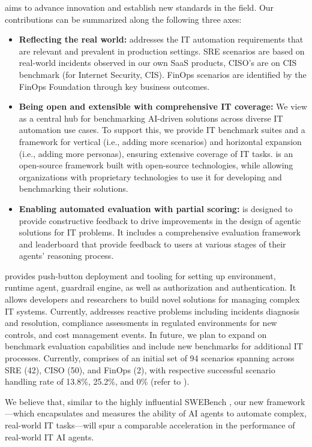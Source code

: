\bench aims to advance innovation and establish new standards in the field. Our contributions can be summarized along the following three axes:

\begin{itemize}[left=0pt, topsep=0pt, partopsep=0pt, itemsep=0pt, parsep=0pt]
\item \textbf{Reflecting the real world:} \bench  addresses the IT automation requirements that are relevant and prevalent in production settings. SRE scenarios are based on real-world incidents observed in our own SaaS products, CISO’s are on CIS benchmark (for Internet Security, CIS). FinOps scenarios are identified by the FinOps Foundation \cite{finopsbench} through key business outcomes.

\item \textbf{Being open and extensible with comprehensive IT coverage:} 
We view \bench as a central hub for benchmarking AI-driven solutions across diverse IT automation use cases. To support this, we provide IT benchmark suites and a framework for vertical (i.e., adding more scenarios) and horizontal expansion (i.e., adding more personas), ensuring extensive coverage of IT tasks. 
\bench is an open-source framework built with open-source technologies, while allowing organizations with proprietary technologies to use it for developing and benchmarking their solutions.  


\item \textbf{Enabling automated evaluation with partial scoring:} 
\bench is designed to provide constructive feedback to drive improvements in the design of agentic solutions for IT problems. It includes a comprehensive evaluation framework and leaderboard that provide feedback to users at various stages of their agents' reasoning process. %

\end{itemize}

\bench provides push-button 
deployment and tooling for setting up environment, runtime agent, guardrail engine, as well as authorization and authentication. It allows developers and researchers to build novel solutions for managing complex IT systems. 
Currently, \bench addresses reactive problems including incidents diagnosis and resolution, 
compliance assessments in regulated environments for new controls, and cost management events. 
In future, we plan to expand on benchmark evaluation capabilities and include new benchmarks for additional IT processes. 
Currently, \bench comprises of an initial set of 94 scenarios spanning across SRE (42), CISO (50), and FinOps (2), with respective successful scenario handling rate of 13.8\%, 25.2\%, and 0\% (refer to ).

We believe that, similar to the highly influential SWEBench \cite{jimenez2024swebench}, our new \bench framework—which encapsulates and measures the ability of AI agents to automate complex, real-world IT tasks—will spur a comparable acceleration in the performance of real-world IT AI agents.


